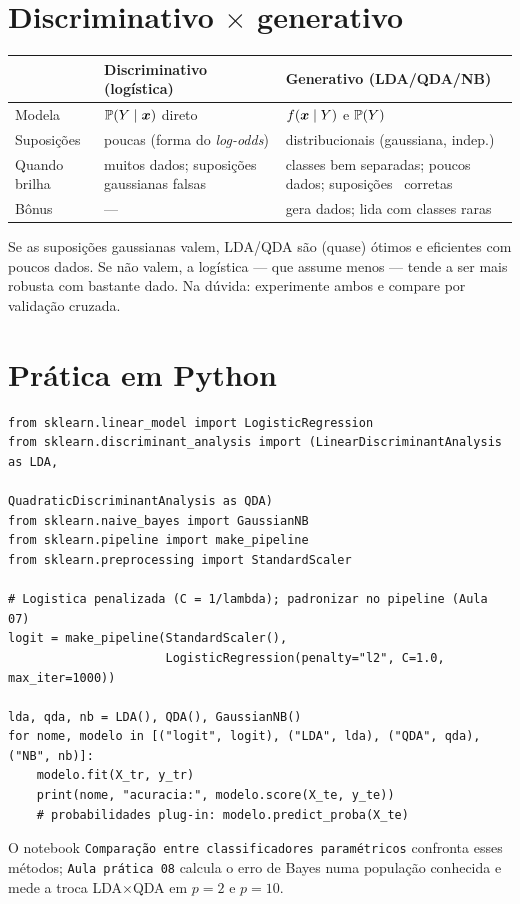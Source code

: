 \documentclass[11pt,a4paper]{article}
\begin{document}
\section{Discriminativo $\times$ generativo}
\begin{center}\small
\renewcommand{\arraystretch}{1.3}
\begin{tabular}{@{}p{3.2cm}p{5.4cm}p{5.4cm}@{}}
\toprule
 & \textbf{Discriminativo (logística)} & \textbf{Generativo (LDA/QDA/NB)} \\
\midrule
Modela & $\mathbb{P}(Y\mid\bm{x})$ direto & $f(\bm{x}\mid Y)$ e $\mathbb{P}(Y)$ \\
Suposições & poucas (forma do \emph{log-odds}) & distribucionais (gaussiana, indep.) \\
Quando brilha & muitos dados; suposições gaussianas falsas & classes bem separadas; poucos dados; suposições ~corretas \\
Bônus & --- & gera dados; lida com classes raras \\
\bottomrule
\end{tabular}
\end{center}

\begin{ideia}
Se as suposições gaussianas valem, LDA/QDA são (quase) ótimos e eficientes com
poucos dados. Se não valem, a logística --- que assume menos --- tende a ser mais
robusta com bastante dado. Na dúvida: experimente ambos e compare por validação
cruzada.
\end{ideia}

\section{Prática em Python}
\begin{lstlisting}
from sklearn.linear_model import LogisticRegression
from sklearn.discriminant_analysis import (LinearDiscriminantAnalysis as LDA,
                                           QuadraticDiscriminantAnalysis as QDA)
from sklearn.naive_bayes import GaussianNB
from sklearn.pipeline import make_pipeline
from sklearn.preprocessing import StandardScaler

# Logistica penalizada (C = 1/lambda); padronizar no pipeline (Aula 07)
logit = make_pipeline(StandardScaler(),
                      LogisticRegression(penalty="l2", C=1.0, max_iter=1000))

lda, qda, nb = LDA(), QDA(), GaussianNB()
for nome, modelo in [("logit", logit), ("LDA", lda), ("QDA", qda), ("NB", nb)]:
    modelo.fit(X_tr, y_tr)
    print(nome, "acuracia:", modelo.score(X_te, y_te))
    # probabilidades plug-in: modelo.predict_proba(X_te)
\end{lstlisting}
O notebook \texttt{Comparação entre classificadores paramétricos} confronta esses
métodos; \texttt{Aula prática 08} calcula o erro de Bayes numa população conhecida
e mede a troca LDA$\times$QDA em $p=2$ e $p=10$.
\end{document}
